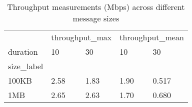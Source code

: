 \begin{table}[htbp]
\caption{Throughput measurements (Mbps) across different message sizes}
\label{tab:throughput}
\begin{tabular}{lllll}
\toprule
 & \multicolumn{2}{r}{throughput_max} & \multicolumn{2}{r}{throughput_mean} \\
duration & 10 & 30 & 10 & 30 \\
size_label &  &  &  &  \\
\midrule
100KB & 2.58 & 1.83 & 1.90 & 0.517 \\
1MB & 2.65 & 2.63 & 1.70 & 0.680 \\
\bottomrule
\end{tabular}
\end{table}

